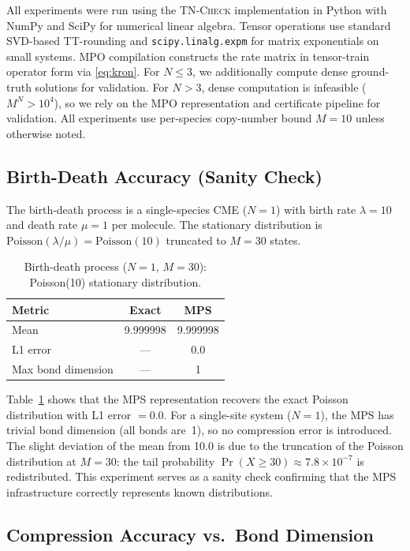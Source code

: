 \documentclass[11pt]{article}
\newcommand{\tncheck}{\textsc{TN-Check}}
\begin{document}
All experiments were run using the \tncheck{} implementation in
Python with NumPy and SciPy for numerical linear algebra.
Tensor operations use standard SVD-based TT-rounding and
\texttt{scipy.linalg.expm} for matrix exponentials on small systems.
MPO compilation constructs the rate matrix in tensor-train operator
form via \eqref{eq:kron}.
For $N \leq 3$, we additionally compute dense ground-truth solutions
for validation.
For $N > 3$, dense computation is infeasible ($M^N > 10^4$), so we
rely on the MPO representation and certificate pipeline for
validation.
All experiments use per-species copy-number bound $M=10$ unless
otherwise noted.

\subsection{Birth-Death Accuracy (Sanity Check)}\label{sec:exp:bd}

The birth-death process is a single-species CME ($N=1$) with birth rate
$\lambda = 10$ and death rate $\mu = 1$ per molecule.
The stationary distribution is
$\mathrm{Poisson}(\lambda/\mu) = \mathrm{Poisson}(10)$
truncated to $M=30$ states.

\begin{table}[t]
\centering
\caption{Birth-death process ($N=1$, $M=30$): Poisson(10) stationary distribution.}
\label{tab:bd}
\begin{tabular}{lcc}
\toprule
\textbf{Metric} & \textbf{Exact} & \textbf{MPS} \\
\midrule
Mean & 9.999998 & 9.999998 \\
L1 error & --- & 0.0 \\
Max bond dimension & --- & 1 \\
\bottomrule
\end{tabular}
\end{table}

Table~\ref{tab:bd} shows that the MPS representation recovers the
exact Poisson distribution with L1 error $= 0.0$.
For a single-site system ($N=1$), the MPS has trivial bond dimension
(all bonds are~1), so no compression error is introduced.
The slight deviation of the mean from 10.0 is due to the truncation
of the Poisson distribution at $M=30$: the tail probability
$\Pr(X \geq 30) \approx 7.8 \times 10^{-7}$ is redistributed.
This experiment serves as a sanity check confirming that the MPS
infrastructure correctly represents known distributions.

\subsection{Compression Accuracy vs.\ Bond Dimension}\label{sec:exp:compression}
\end{document}
